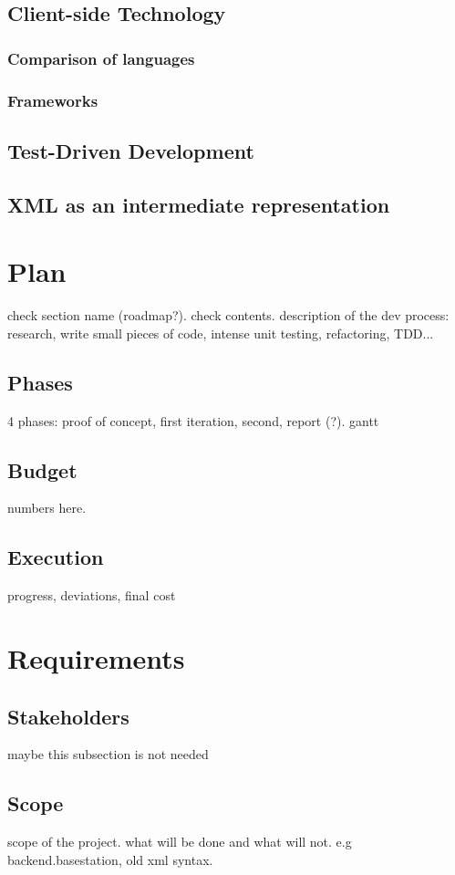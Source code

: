\section{Client-side Technology}

\subsection{Comparison of languages}
\subsection{Frameworks}

\section{Test-Driven Development}
\section{XML as an intermediate representation}


\chapter{Plan}
check section name (roadmap?). check contents.
description of the dev process: research, write small pieces of code, intense unit testing, refactoring, TDD...

\section{Phases}
4 phases: proof of concept, first iteration, second, report (?). gantt
\section{Budget}
numbers here.
\section{Execution}
progress, deviations, final cost


\chapter{Requirements}
\section{Stakeholders}
maybe this subsection is not needed
\section{Scope}
scope of the project. what will be done and what will not. e.g backend.basestation, old xml syntax.


